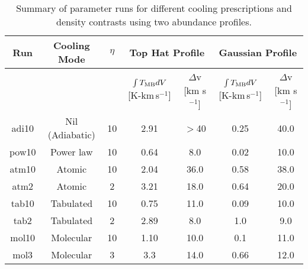 \documentclass[useAMS,usenatbib]{mn2e}
\begin{document}
\begin{table*}
\centering 
\caption{Summary of parameter runs for different cooling prescriptions and density contrasts using two abundance profiles.}
\begin{tabular}{c | c | c | c | c | c | c }
\hline
Run & Cooling Mode & $\eta$ & \multicolumn{2}{|c|}{Top Hat Profile} & \multicolumn{2}{|c|}{Gaussian Profile}\\
\hline\hline
&&& $\int T_{\rm MB}dV$ [K-km\,s$^{-1}$] & $\Delta$v [km s$^{-1}$] & $\int T_{\rm MB}dV$ [K-km\,s$^{-1}$] & $\Delta$v [km s$^{-1}$] \\
\hline
adi10 & Nil (Adiabatic) & 10 & 2.91 & $>$40 & 0.25 & 40.0 \\
pow10 & Power law & 10 & 0.64 & 8.0 & 0.02 & 10.0\\
atm10 & Atomic & 10 & 2.04 & 36.0 & 0.58 & 38.0 \\
atm2 & Atomic & 2 & 3.21 & 18.0 & 0.64 & 20.0 \\
tab10 & Tabulated & 10 & 0.75 & 11.0 & 0.09 & 10.0 \\
tab2 & Tabulated & 2 & 2.89 & 8.0 & 1.0 & 9.0 \\
mol10 & Molecular & 10 & 1.10 & 10.0 & 0.1 & 11.0 \\
mol3 & Molecular & 3 & 3.3 & 14.0 & 0.66 & 12.0\\
\hline
\end{tabular}
\label{tab:result1}
\end{table*}


 

\end{document}
